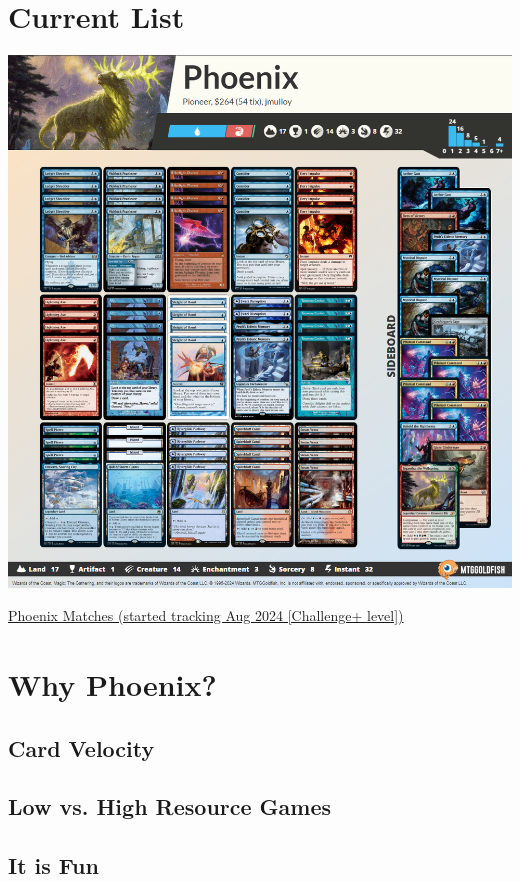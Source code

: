 \documentclass[12pt]{article}
\begin{document}
\section{Current List}
\begin{center}
    \href{https://www.mtggoldfish.com/deck/6561022#online}{\includegraphics[width=1\textwidth]{decklist}}

    \href{https://docs.google.com/spreadsheets/d/1DheUoGrQmpuwzbMDpPVJHcCrfe7UOyXSMSSkL8aXnv0/edit?usp=sharing}{Phoenix Matches (started tracking Aug 2024 [Challenge+ level])}
\end{center}

\clearpage
\section{Why Phoenix?}
\subsection{Card Velocity}

\subsection{Low vs. High Resource Games}

\subsection{It is Fun}
\end{document}
